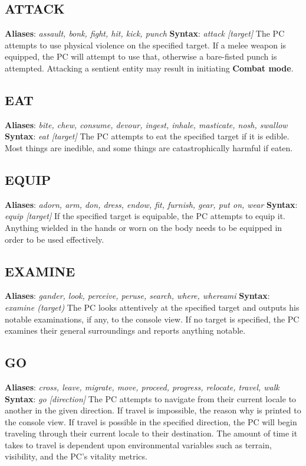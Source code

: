 \documentclass[11pt]{article}
\begin{document}
	\subsection{ATTACK}
	\textbf{Aliases}: \textit{assault, bonk, fight, hit, kick, punch}\newline
	\textbf{Syntax}: \textit{attack [target]}\newline
	The PC attempts to use physical violence on the specified target. If a melee weapon is equipped, the PC will attempt to use that, otherwise a bare-fisted punch is attempted. Attacking a sentient entity may result in initiating \textbf{Combat mode}.
	\subsection{EAT}
	\textbf{Aliases}: \textit{bite, chew, consume, devour, ingest, inhale, masticate, nosh, swallow}\newline
	\textbf{Syntax}: \textit{eat [target]}\newline
	The PC attempts to eat the specified target if it is edible. Most things are inedible, and some things are catastrophically harmful if eaten.
	\subsection{EQUIP}
	\textbf{Aliases}: \textit{adorn, arm, don, dress, endow, fit, furnish, gear, put on, wear}\newline
	\textbf{Syntax}: \textit{equip [target]}\newline
	If the specified target is equipable, the PC attempts to equip it. Anything wielded in the hands or worn on the body needs to be equipped in order to be used effectively.
	\subsection{EXAMINE}
	\textbf{Aliases}: \textit{gander, look, perceive, peruse, search, where, whereami}\newline
	\textbf{Syntax}: \textit{examine (target)}\newline
	The PC looks attentively at the specified target and outputs his notable examinations, if any, to the console view. If no target is specified, the PC examines their general surroundings and reports anything notable.
	\subsection{GO}
	\textbf{Aliases}: \textit{cross, leave, migrate, move, proceed, progress, relocate, travel, walk}\newline
	\textbf{Syntax}: \textit{go [direction]}\newline
	The PC attempts to navigate from their current locale to another in the given direction. If travel is impossible, the reason why is printed to the console view. If travel is possible in the specified direction, the PC will begin traveling through their current locale to their destination. The amount of time it takes to travel is dependent upon environmental variables such as terrain, visibility, and the PC's vitality metrics.
\end{document}
